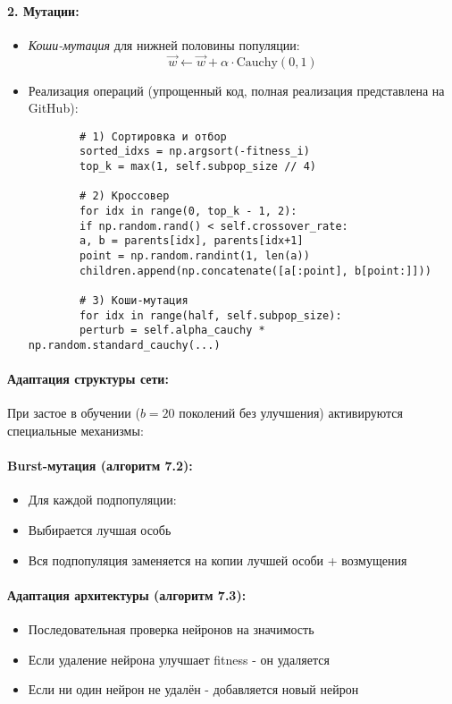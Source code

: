 \documentclass[a4paper,12pt]{article}
\begin{document}
\paragraph{2. Мутации:}
\begin{itemize}
	\item \textit{Коши-мутация} для нижней половины популяции:
	\[
	\vec{w} \leftarrow \vec{w} + \alpha \cdot \text{Cauchy}(0,1)
	\]
\end{itemize}

\begin{itemize}
	\item[] Реализация операций (упрощенный код, полная реализация представлена на GitHub):
	\begin{lstlisting}
		# 1) Сортировка и отбор
		sorted_idxs = np.argsort(-fitness_i)
		top_k = max(1, self.subpop_size // 4)
		
		# 2) Кроссовер
		for idx in range(0, top_k - 1, 2):
		if np.random.rand() < self.crossover_rate:
		a, b = parents[idx], parents[idx+1]
		point = np.random.randint(1, len(a))
		children.append(np.concatenate([a[:point], b[point:]]))
		
		# 3) Коши-мутация
		for idx in range(half, self.subpop_size):
		perturb = self.alpha_cauchy * np.random.standard_cauchy(...)
	\end{lstlisting}
\end{itemize}

\paragraph{Адаптация структуры сети:}

При застое в обучении ($b=20$ поколений без улучшения) активируются специальные механизмы:

\paragraph{Burst-мутация (алгоритм 7.2):}
\begin{itemize}
	\item Для каждой подпопуляции:
	\item Выбирается лучшая особь
	\item Вся подпопуляция заменяется на копии лучшей особи + возмущения
\end{itemize}

\paragraph{Адаптация архитектуры (алгоритм 7.3):}
\begin{itemize}
	\item Последовательная проверка нейронов на значимость
	\item Если удаление нейрона улучшает fitness - он удаляется
	\item Если ни один нейрон не удалён - добавляется новый нейрон
\end{itemize}
\end{document}

